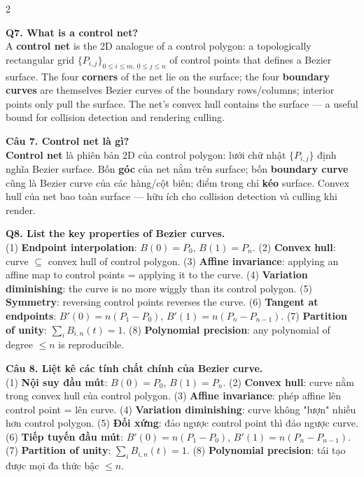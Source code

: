 \begin{paracol}{2}
\switchcolumn*

\textbf{Q7. What is a control net?}\\
A \textbf{control net} is the 2D analogue of a control polygon: a topologically rectangular grid $\{P_{i,j}\}_{0\le i\le m,\, 0\le j\le n}$ of control points that defines a Bezier surface. The four \textbf{corners} of the net lie on the surface; the four \textbf{boundary curves} are themselves Bezier curves of the boundary rows/columns; interior points only pull the surface. The net's convex hull contains the surface — a useful bound for collision detection and rendering culling.

\switchcolumn

\textbf{Câu 7. Control net là gì?}\\
\textbf{Control net} là phiên bản 2D của control polygon: lưới chữ nhật $\{P_{i,j}\}$ định nghĩa Bezier surface. Bốn \textbf{góc} của net nằm trên surface; bốn \textbf{boundary curve} cũng là Bezier curve của các hàng/cột biên; điểm trong chỉ \textbf{kéo} surface. Convex hull của net bao toàn surface — hữu ích cho collision detection và culling khi render.

\switchcolumn*

\textbf{Q8. List the key properties of Bezier curves.}\\
(1) \textbf{Endpoint interpolation}: $B(0)=P_0$, $B(1)=P_n$.
(2) \textbf{Convex hull}: curve $\subseteq$ convex hull of control polygon.
(3) \textbf{Affine invariance}: applying an affine map to control points = applying it to the curve.
(4) \textbf{Variation diminishing}: the curve is no more wiggly than its control polygon.
(5) \textbf{Symmetry}: reversing control points reverses the curve.
(6) \textbf{Tangent at endpoints}: $B'(0)=n(P_1-P_0)$, $B'(1)=n(P_n-P_{n-1})$.
(7) \textbf{Partition of unity}: $\sum_i B_{i,n}(t)=1$.
(8) \textbf{Polynomial precision}: any polynomial of degree $\le n$ is reproducible.

\switchcolumn

\textbf{Câu 8. Liệt kê các tính chất chính của Bezier curve.}\\
(1) \textbf{Nội suy đầu mút}: $B(0)=P_0$, $B(1)=P_n$.
(2) \textbf{Convex hull}: curve nằm trong convex hull của control polygon.
(3) \textbf{Affine invariance}: phép affine lên control point = lên curve.
(4) \textbf{Variation diminishing}: curve không "lượn" nhiều hơn control polygon.
(5) \textbf{Đối xứng}: đảo ngược control point thì đảo ngược curve.
(6) \textbf{Tiếp tuyến đầu mút}: $B'(0)=n(P_1-P_0)$, $B'(1)=n(P_n-P_{n-1})$.
(7) \textbf{Partition of unity}: $\sum_i B_{i,n}(t)=1$.
(8) \textbf{Polynomial precision}: tái tạo được mọi đa thức bậc $\le n$.


\end{paracol}
